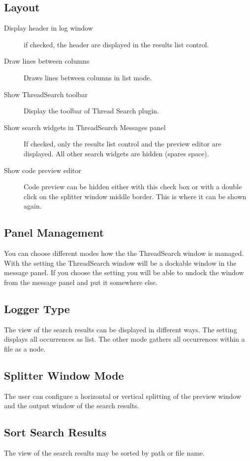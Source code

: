 \subsection{Layout}

\begin{description}
\item[Display header in log window] if checked, the header are displayed in the results list control.
\item[Draw lines between columns] Draws lines between columns in list mode.
\item[Show ThreadSearch toolbar] Display the toolbar of Thread Search plugin.
\item[Show search widgets in ThreadSearch Messages panel] If checked, only the results list control and the preview editor are displayed. All other search widgets are hidden (spares space).
\item[Show code preview editor] Code preview can be hidden either with this check box or with a double click on the splitter window middle border. This is where it can be shown again.
\end{description}

\subsection{Panel Management}

You can choose different modes how the the ThreadSearch window is managed. With the setting  the ThreadSearch window will be a dockable window in the message panel. If you choose the setting  you will be able to undock the window from the message panel and put it somewhere else.

\subsection{Logger Type}

The view of the search results can be displayed in different ways. The setting  displays all occurrences as list. The other mode  gathers all occurrences within a file as a node.

\subsection{Splitter Window Mode}

The user can configure a horizontal or vertical splitting of the preview window and the output window of the search results.

\subsection{Sort Search Results}

The view of the search results may be sorted by path or file name.
